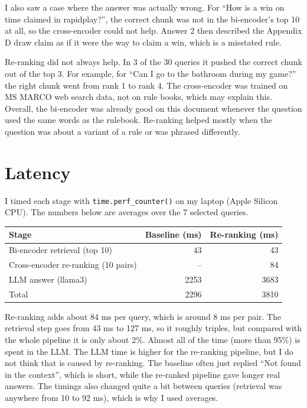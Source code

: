 \documentclass[11pt,a4paper]{article}
\begin{document}
I also saw a case where the answer was actually wrong. For ``How is a win on time claimed in rapidplay?'', the correct chunk was not in the bi-encoder's top 10 at all, so the cross-encoder could not help. Answer 2 then described the Appendix D draw claim as if it were the way to claim a win, which is a misstated rule.

Re-ranking did not always help. In 3 of the 30 queries it pushed the correct chunk out of the top 3. For example, for ``Can I go to the bathroom during my game?'' the right chunk went from rank 1 to rank 4. The cross-encoder was trained on MS MARCO web search data, not on rule books, which may explain this. Overall, the bi-encoder was already good on this document whenever the question used the same words as the rulebook. Re-ranking helped mostly when the question was about a variant of a rule or was phrased differently.

\section{Latency}

I timed each stage with \texttt{time.perf\_counter()} on my laptop (Apple Silicon CPU). The numbers below are averages over the 7 selected queries.

\begin{center}
\begin{tabular}{@{}lrr@{}}
\toprule
Stage & Baseline (ms) & Re-ranking (ms) \\
\midrule
Bi-encoder retrieval (top 10)       & 43    & 43    \\
Cross-encoder re-ranking (10 pairs) & --    & 84    \\
LLM answer (llama3)                 & 2253  & 3683  \\
\midrule
Total                               & 2296  & 3810  \\
\bottomrule
\end{tabular}
\end{center}

Re-ranking adds about 84 ms per query, which is around 8 ms per pair. The retrieval step goes from 43 ms to 127 ms, so it roughly triples, but compared with the whole pipeline it is only about 2\%. Almost all of the time (more than 95\%) is spent in the LLM. The LLM time is higher for the re-ranking pipeline, but I do not think that is caused by re-ranking. The baseline often just replied ``Not found in the context'', which is short, while the re-ranked pipeline gave longer real answers. The timings also changed quite a bit between queries (retrieval was anywhere from 10 to 92 ms), which is why I used averages.
\end{document}
